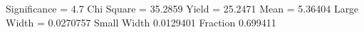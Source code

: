 Significance = 4.7
Chi Square = 35.2859
Yield = 25.2471
Mean = 5.36404
Large Width = 0.0270757
Small Width 0.0129401
Fraction 0.699411
